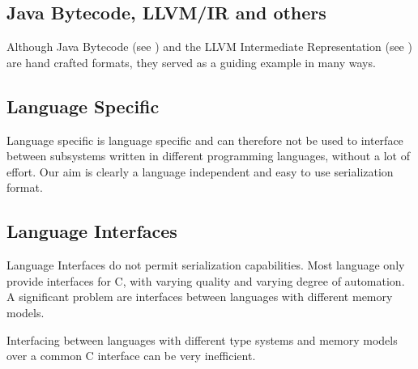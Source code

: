 \subsection*{Java Bytecode, LLVM/IR and others}

Although Java Bytecode (see \cite{jvmspec}) and the LLVM Intermediate Representation (see \cite{llvm}) are hand crafted formats, they served as a guiding example in many ways.


\subsection*{Language Specific}

Language specific is language specific and can therefore not be used to interface between subsystems written in different programming languages, without a lot of effort. Our aim is clearly a language independent and easy to use serialization format.
\nocite{ada05}


\subsection*{Language Interfaces}
Language Interfaces do not permit serialization capabilities. Most language only provide interfaces for C, with varying quality and varying degree of automation. A significant problem are interfaces between languages with different memory models.

Interfacing between languages with different type systems and memory models over a common C interface can be very inefficient.
